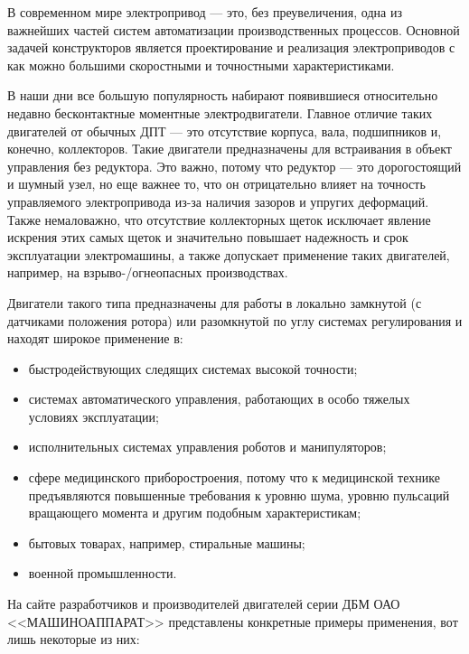 \intro

В современном мире электропривод — это, без преувеличения, одна из важнейших частей 
систем автоматизации производственных процессов. Основной задачей конструкторов
является проектирование и реализация электроприводов с как можно большими скоростными
и точностными характеристиками. 

В наши дни все большую популярность набирают появившиеся 
относительно недавно бесконтактные моментные электродвигатели. 
Главное отличие таких двигателей от обычных ДПТ — это отсутствие корпуса, 
вала, подшипников и, конечно, коллекторов. Такие двигатели предназначены для 
встраивания в объект управления без редуктора. Это важно, потому что редуктор — 
это дорогостоящий и шумный узел, но еще важнее то, что он отрицательно влияет 
на точность управляемого электропривода из-за наличия зазоров и 
упругих деформаций. Также немаловажно, что отсутствие коллекторных щеток исключает явление искрения
этих самых щеток и значительно повышает надежность и срок эксплуатации электромашины, а
также допускает применение таких двигателей, например, на взрыво-/огнеопасных производствах.

Двигатели такого
типа предназначены для работы в локально замкнутой (с датчиками положения ротора) 
или разомкнутой по углу системах регулирования и находят широкое применение в:

\begin{itemize}
  \item быстродействующих следящих системах высокой точности;

  \item системах автоматического управления, работающих в особо 
    тяжелых условиях эксплуатации;

  \item исполнительных системах управления роботов и манипуляторов;

  \item сфере медицинского приборостроения, потому что к медицинской технике
    предъявляются повышенные требования к уровню шума, уровню пульсаций 
    вращающего момента и другим подобным характеристикам;
  
  \item бытовых товарах, например, стиральные машины;
  
  \item военной промышленности.
\end{itemize}

На сайте \cite{Машиноаппарат} разработчиков и производителей двигателей серии ДБМ ОАО <<МАШИНОАППАРАТ>> 
представлены конкретные примеры применения, вот лишь некоторые из них:

